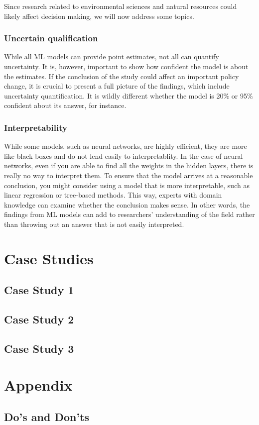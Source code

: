 \documentclass[
]{book}
\begin{document}
Since research related to environmental sciences and natural resources could likely affect decision making, we will now address some topics.

\hypertarget{uncertain-qualification}{%
\subsection{Uncertain qualification}\label{uncertain-qualification}}

While all ML models can provide point estimates, not all can quantify uncertainty. It is, however, important to show how confident the model is about the estimates. If the conclusion of the study could affect an important policy change, it is crucial to present a full picture of the findings, which include uncertainty quantification. It is wildly different whether the model is 20\% or 95\% confident about its answer, for instance.

\hypertarget{interpretability}{%
\subsection{Interpretability}\label{interpretability}}

While some models, such as neural networks, are highly efficient, they are more like black boxes and do not lend easily to interpretablity. In the case of neural networks, even if you are able to find all the weights in the hidden layers, there is really no way to interpret them. To ensure that the model arrives at a reasonable conclusion, you might consider using a model that is more interpretable, such as linear regression or tree-based methods. This way, experts with domain knowledge can examine whether the conclusion makes sense. In other words, the findings from ML models can add to researchers' understanding of the field rather than throwing out an answer that is not easily interpreted.

\hypertarget{case-studies}{%
\chapter{Case Studies}\label{case-studies}}

\hypertarget{case-study-1}{%
\section{Case Study 1}\label{case-study-1}}

\hypertarget{case-study-2}{%
\section{Case Study 2}\label{case-study-2}}

\hypertarget{case-study-3}{%
\section{Case Study 3}\label{case-study-3}}

\hypertarget{appendix}{%
\chapter{Appendix}\label{appendix}}

\hypertarget{dos-and-donts}{%
\section{Do's and Don'ts}\label{dos-and-donts}}

  
\end{document}
